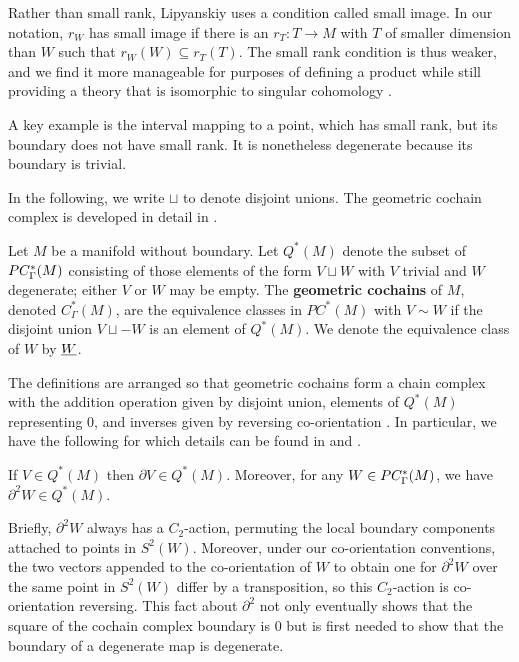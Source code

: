 Rather than small rank, Lipyanskiy uses a condition called small image.
In our notation, $r_W$ has small image if there is an $r_T \colon T \to M$ with $T$ of smaller dimension than $W$ such that $r_W(W) \subseteq r_T(T)$.
The small rank condition is thus weaker, and we find it more manageable for purposes of defining a product while still providing a theory that is isomorphic to singular cohomology \cite[Theorem 5.34]{medina2022foundations}.

A key example is the interval mapping to a point, which has small rank, but its boundary does not have small rank.
It is nonetheless degenerate because its boundary is trivial.

In the following, we write $\sqcup$ to denote disjoint unions.
The geometric cochain complex is developed in detail in \cite[Section 4.2]{medina2022foundations}.

\begin{definition}\label{D:geometric cohomology}
	Let $M$ be a manifold without boundary. Let $Q^*(M)$ denote the subset of $PC_\Gamma^*(M)$ consisting of  those elements of the form $V \sqcup W$ with $V$ trivial and $W$ degenerate; either $V$ or $W$ may be empty.
	The \textbf{geometric cochains} of $M$, denoted $C_\Gamma^*(M)$, are the equivalence classes in $PC^*(M)$ with $V \sim W$ if the disjoint union $V \sqcup -W$ is an element of $Q^*(M)$.
	We denote the equivalence class of $W$ by $\underline{W}$.
\end{definition}

The definitions are arranged so that geometric cochains form a chain complex with the addition operation given by disjoint union, elements of $Q^*(M)$ representing $0$, and inverses given by reversing co-orientation \cite[Lemma 4.19]{medina2022foundations}.
In particular, we have the following for which details can be found in \cite{Lipy14} and \cite[Lemma 3.26]{medina2022foundations}.

\begin{proposition}
	If $V \in Q^*(M)$ then $\partial V \in Q^*(M)$.
	Moreover, for any $W \in PC_\Gamma^*(M)$, we have $\partial^2 W \in Q^*(M)$.
\end{proposition}


Briefly, $\partial^2 W$ always has a $C_2$-action, permuting the local boundary components attached to points in $S^2(W)$.
Moreover, under our co-orientation conventions, the two vectors appended to the co-orientation of $W$ to obtain one for $\partial^2 W$ over the same point in $S^2(W)$ differ by a transposition, so this $C_2$-action is co-orientation reversing.
This fact about $\partial^2$ not only eventually shows that the square of the cochain complex boundary is $0$ but is first needed to show that the boundary of a degenerate map is degenerate.


